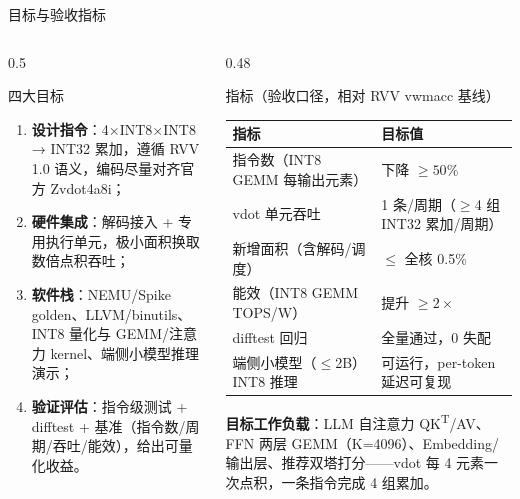 \documentclass[aspectratio=169]{beamer}
\newcommand{\smalltable}[1]{\par\centering\scriptsize #1\par}
\begin{document}
\begin{frame}{目标与验收指标}
\begin{columns}[T]
\begin{column}{0.5\textwidth}
\begin{block}{四大目标}
\begin{enumerate}
  \item \textbf{设计指令}：4×INT8×INT8 → INT32 累加，遵循 RVV 1.0 语义，编码尽量对齐官方 Zvdot4a8i；
  \item \textbf{硬件集成}：解码接入 + 专用执行单元，极小面积换取数倍点积吞吐；
  \item \textbf{软件栈}：NEMU/Spike golden、LLVM/binutils、INT8 量化与 GEMM/注意力 kernel、端侧小模型推理演示；
  \item \textbf{验证评估}：指令级测试 + difftest + 基准（指令数/周期/吞吐/能效），给出可量化收益。
\end{enumerate}
\end{block}
\end{column}
\begin{column}{0.48\textwidth}
\begin{block}{指标（验收口径，相对 RVV vwmacc 基线）}
\smalltable{%
\begin{tabular}{@{}ll@{}}
\toprule
指标 & 目标值 \\
\midrule
指令数（INT8 GEMM 每输出元素） & 下降 $\ge 50\%$ \\
vdot 单元吞吐 & 1 条/周期（$\ge$4 组 INT32 累加/周期） \\
新增面积（含解码/调度） & $\le$ 全核 0.5\% \\
能效（INT8 GEMM TOPS/W） & 提升 $\ge 2\times$ \\
difftest 回归 & 全量通过，0 失配 \\
端侧小模型（$\le$2B）INT8 推理 & 可运行，per-token 延迟可复现 \\
\bottomrule
\end{tabular}}
\end{block}
\textbf{目标工作负载}：LLM 自注意力 QK\textsuperscript{T}/AV、FFN 两层 GEMM（K=4096）、Embedding/输出层、推荐双塔打分——vdot 每 4 元素一次点积，一条指令完成 4 组累加。
\end{column}
\end{columns}
\end{frame}
\end{document}
